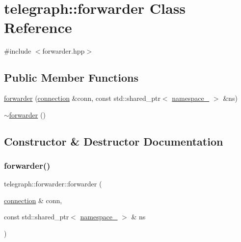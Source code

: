 \hypertarget{classtelegraph_1_1forwarder}{}\section{telegraph\+:\+:forwarder Class Reference}
\label{classtelegraph_1_1forwarder}


{\ttfamily \#include $<$forwarder.\+hpp$>$}

\subsection*{Public Member Functions}
\begin{DoxyCompactItemize}
\item 
\hyperlink{classtelegraph_1_1forwarder_abdd83232ce225a8d3f9ccd014ee5eeb2}{forwarder} (\hyperlink{classtelegraph_1_1connection}{connection} \&conn, const std\+::shared\+\_\+ptr$<$ \hyperlink{classtelegraph_1_1namespace__}{namespace\+\_\+} $>$ \&ns)
\item 
\hyperlink{classtelegraph_1_1forwarder_a61d26a7a1b8198e65824c720ab946052}{$\sim$forwarder} ()
\end{DoxyCompactItemize}


\subsection{Constructor \& Destructor Documentation}
\mbox{\label{classtelegraph_1_1forwarder_abdd83232ce225a8d3f9ccd014ee5eeb2}} 
\subsubsection{\texorpdfstring{forwarder()}{forwarder()}}
{\footnotesize\ttfamily telegraph\+::forwarder\+::forwarder (\begin{DoxyParamCaption}\item[{\hyperlink{classtelegraph_1_1connection}{connection} \&}]{conn,  }\item[{const std\+::shared\+\_\+ptr$<$ \hyperlink{classtelegraph_1_1namespace__}{namespace\+\_\+} $>$ \&}]{ns }\end{DoxyParamCaption})}

\mbox{\label{classtelegraph_1_1forwarder_a61d26a7a1b8198e65824c720ab946052}} 
